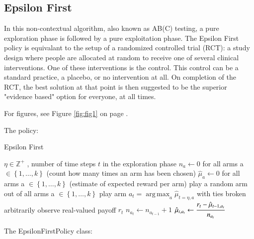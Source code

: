\documentclass[nojss]{jss}\usepackage[]{graphicx}\usepackage[]{color}
\DeclareMathOperator*{\argmax}{arg\,max}
\begin{document}
\subsection{Epsilon First}

In this non-contextual algorithm, also known as AB(C) testing, a pure exploration phase is followed by a pure exploitation phase. The Epsilon First policy is equivalant to the setup of a randomized controlled trial (RCT): a study design where people are allocated at random to receive one of several clinical interventions. One of these interventions is the control. This control can be a standard practice, a placebo, or no intervention at all. On completion of the RCT, the best solution at that point is then suggested to be the superior "evidence based" option for everyone, at all times.

For figures, see Figure \ref{fig:fig1} on page \pageref{fig:fig1}.

The policy:

\begin{algorithm}[H]
\caption{Epsilon First}
\label{Alg:EpsilonFirst}
\begin{algorithmic}
\REQUIRE \(   \eta \in \mathbb{Z}^{+} \)  , number of time steps $t$ in the exploration phase
\STATE \( n_{a} \leftarrow 0 \) for all arms a \(  \in \left\{ 1, \dots, k \right\} \)  (count how many times an arm has been chosen)
\STATE \( \hat{\mu}_{a} \leftarrow 0 \) for all arms a  \(   \in \left\{ 1, \dots, k \right\} \)  (estimate of expected reward per arm)
	       \STATE play a random arm out of all arms a \(   \in \left\{ 1, \dots, k \right\} \)
	\ELSE
	        \STATE play arm \(a_t = \argmax_a  \hat{\mu}_{t=\eta,a}  \) with ties broken arbitrarily
	\ENDIF
	\STATE observe real-valued payoff $r_t$
	\STATE \( n_{a_{t}} \leftarrow n_{a_{t-1}} + 1  \)
   \STATE \( \hat{\mu}_{t,a_{t}} \leftarrow   \cfrac{r_t - \hat{\mu}_{t-1,a_{t}} }{n_{a_{t}}}   \)
\ENDFOR
\end{algorithmic}
\end{algorithm}


The EpsilonFirstPolicy class:
\end{document}
